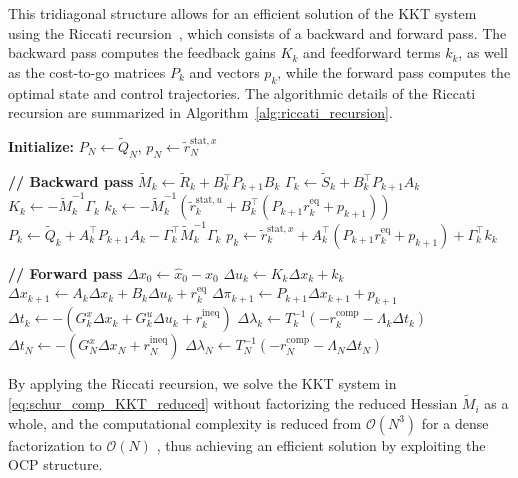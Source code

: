\documentclass[class=scrbook, crop=false]{standalone}
\begin{document}
This tridiagonal structure allows for an efficient solution of the \gls{KKT} system 
using the Riccati recursion~\cite{rao1998application}, which consists of a backward and forward pass.
The backward pass computes the feedback gains $K_k$ and feedforward terms $k_k$,
as well as the cost-to-go matrices $P_k$ and vectors $p_k$,
while the forward pass computes the optimal state and control trajectories.
The algorithmic details of the Riccati recursion are summarized in Algorithm~\ref{alg:riccati_recursion}.
\begin{algorithm}[htbp]
\caption{Riccati recursion for solving a \gls{QP} with OCP structure in \eqref{eq:ocp_qp}}
\label{alg:riccati_recursion}
\begin{algorithmic}[1]
\State\textbf{Initialize:} $P_N \gets \tilde{Q}_N$, $p_N \gets \tilde{r}_N^{\mathrm{stat}, x}$

\Statex
\Statex\textbf{// Backward pass}
    \State $\tilde{M}_k \gets \tilde{R}_k + B_k^\top P_{k+1} B_k$
    \State $\Gamma_k \gets \tilde{S}_k + B_k^\top P_{k+1} A_k$
    \State $K_k \gets -\tilde{M}_k^{-1} \Gamma_k$
    \State $k_k \gets -\tilde{M}_k^{-1} \left(\tilde{r}_k^{\mathrm{stat}, u} + B_k^\top (P_{k+1} r_k^{\mathrm{eq}} + p_{k+1})\right)$
    \State $P_k \gets \tilde{Q}_k + A_k^\top P_{k+1} A_k - \Gamma_k^\top \tilde{M}_k^{-1} \Gamma_k$
    \State $p_k \gets \tilde{r}_k^{\mathrm{stat}, x} + A_k^\top (P_{k+1} r_k^{\mathrm{eq}} + p_{k+1}) + \Gamma_k^\top k_k$
\EndFor

\Statex
\Statex \textbf{// Forward pass}
\State $\Delta x_0 \gets \hat{x}_0 - x_0$
    \State $\Delta u_k \gets K_k \Delta x_k + k_k$
    \State $\Delta x_{k+1} \gets A_k \Delta x_k + B_k \Delta u_k + r_k^{\mathrm{eq}}$
    \State $\Delta \pi_{k+1} \gets P_{k+1} \Delta x_{k+1} + p_{k+1}$
    \State $\Delta t_k \gets -(G_k^x \Delta x_k + G_k^u \Delta u_k + r_k^{\mathrm{ineq}})$
    \State $\Delta \lambda_k \gets T_k^{-1} (-r_k^{\mathrm{comp}} - \Lambda_k \Delta t_k)$
\EndFor
\State $\Delta t_N \gets -(G_N^x \Delta x_N + r_N^{\mathrm{ineq}})$
\State $\Delta \lambda_N \gets T_N^{-1} (-r_N^{\mathrm{comp}} - \Lambda_N \Delta t_N)$

\end{algorithmic}
\end{algorithm}

By applying the Riccati recursion, we solve the \gls{KKT} system in \eqref{eq:schur_comp_KKT_reduced} 
without factorizing the reduced Hessian $\tilde{M}_i$ as a whole,
and the computational complexity is reduced from $\mathcal{O}(N^3)$ for 
a dense factorization to $\mathcal{O}(N)$ \cite{rao1998application}, 
thus achieving an efficient solution by exploiting the \gls{OCP} structure.
\end{document}
